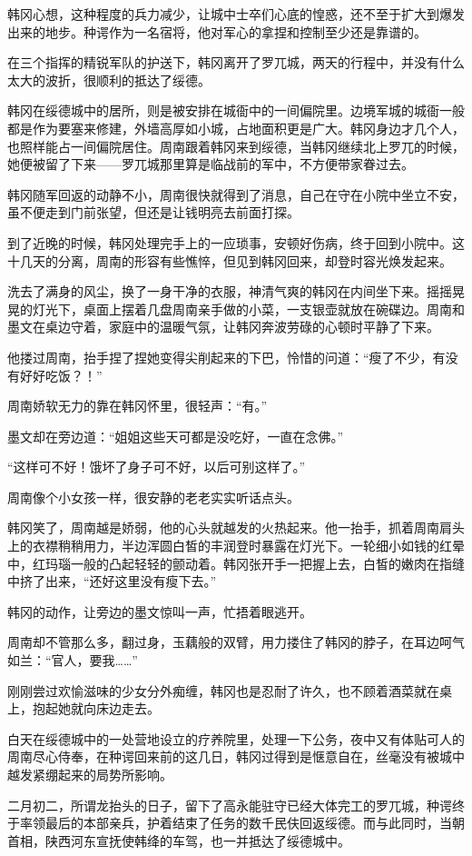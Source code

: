 韩冈心想，这种程度的兵力减少，让城中士卒们心底的惶惑，还不至于扩大到爆发出来的地步。种谔作为一名宿将，他对军心的拿捏和控制至少还是靠谱的。

在三个指挥的精锐军队的护送下，韩冈离开了罗兀城，两天的行程中，并没有什么太大的波折，很顺利的抵达了绥德。

韩冈在绥德城中的居所，则是被安排在城衙中的一间偏院里。边境军城的城衙一般都是作为要塞来修建，外墙高厚如小城，占地面积更是广大。韩冈身边才几个人，也照样能占一间偏院居住。周南跟着韩冈来到绥德，当韩冈继续北上罗兀的时候，她便被留了下来——罗兀城那里算是临战前的军中，不方便带家眷过去。

韩冈随军回返的动静不小，周南很快就得到了消息，自己在守在小院中坐立不安，虽不便走到门前张望，但还是让钱明亮去前面打探。

到了近晚的时候，韩冈处理完手上的一应琐事，安顿好伤病，终于回到小院中。这十几天的分离，周南的形容有些憔悴，但见到韩冈回来，却登时容光焕发起来。

洗去了满身的风尘，换了一身干净的衣服，神清气爽的韩冈在内间坐下来。摇摇晃晃的灯光下，桌面上摆着几盘周南亲手做的小菜，一支银壶就放在碗碟边。周南和墨文在桌边守着，家庭中的温暖气氛，让韩冈奔波劳碌的心顿时平静了下来。

他搂过周南，抬手捏了捏她变得尖削起来的下巴，怜惜的问道：“瘦了不少，有没有好好吃饭？！”

周南娇软无力的靠在韩冈怀里，很轻声：“有。”

墨文却在旁边道：“姐姐这些天可都是没吃好，一直在念佛。”

“这样可不好！饿坏了身子可不好，以后可别这样了。”

周南像个小女孩一样，很安静的老老实实听话点头。

韩冈笑了，周南越是娇弱，他的心头就越发的火热起来。他一抬手，抓着周南肩头上的衣襟稍稍用力，半边浑圆白皙的丰润登时暴露在灯光下。一轮细小如钱的红晕中，红玛瑙一般的凸起轻轻的颤动着。韩冈张开手一把握上去，白皙的嫩肉在指缝中挤了出来，“还好这里没有瘦下去。”

韩冈的动作，让旁边的墨文惊叫一声，忙捂着眼逃开。

周南却不管那么多，翻过身，玉藕般的双臂，用力搂住了韩冈的脖子，在耳边呵气如兰：“官人，要我……”

刚刚尝过欢愉滋味的少女分外痴缠，韩冈也是忍耐了许久，也不顾着酒菜就在桌上，抱起她就向床边走去。

白天在绥德城中的一处营地设立的疗养院里，处理一下公务，夜中又有体贴可人的周南尽心侍奉，在种谔回来前的这几日，韩冈过得到是惬意自在，丝毫没有被城中越发紧绷起来的局势所影响。

二月初二，所谓龙抬头的日子，留下了高永能驻守已经大体完工的罗兀城，种谔终于率领最后的本部亲兵，护着结束了任务的数千民伕回返绥德。而与此同时，当朝首相，陕西河东宣抚使韩绛的车驾，也一并抵达了绥德城中。

